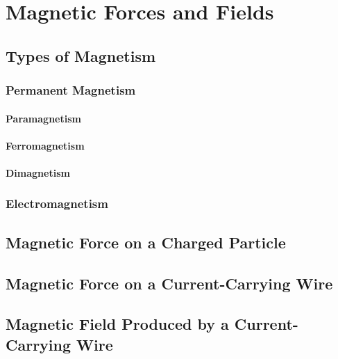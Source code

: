 \chapter{Magnetic Forces and Fields} \label{chap:MagneticForcesandFields}
	\section{Types of Magnetism} 
		\subsection{Permanent Magnetism}
			\subsubsection{Paramagnetism}
			\subsubsection{Ferromagnetism}
			\subsubsection{Dimagnetism}
		\subsection{Electromagnetism}
	\section{Magnetic Force on a Charged Particle}
	\section{Magnetic Force on a Current-Carrying Wire}
	\section{Magnetic Field Produced by a Current-Carrying Wire}
	
	

		
	
	
	

	


